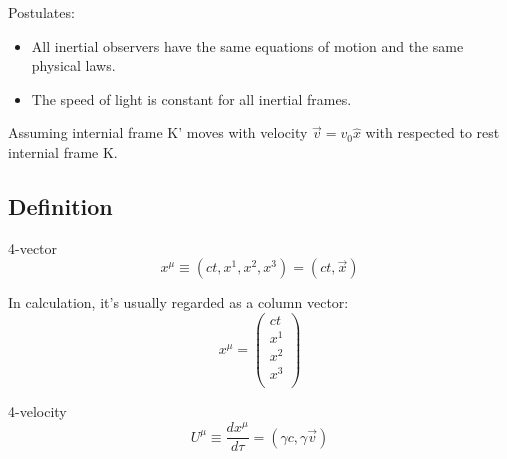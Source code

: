 Postulates:
\begin{itemize}
    \item All inertial observers have the same equations of motion and the same physical laws.
    \item The speed of light is constant for all inertial frames.
\end{itemize}
Assuming internial frame K' moves with velocity $\vec{v} = v_0\hat{x}$ with respected to
rest internial frame K.
\subsection{Definition}
\begin{description}
    \item {4-vector}
	\begin{equation}
	    \label{eqn:sr::4vectors}
		x^\mu \equiv (ct, x^1, x^2, x^3) = (ct, \vec{x})
	\end{equation}

	In calculation, it's usually regarded as a column vector:
	\begin{equation}
	    x^\mu = 
	    \begin{pmatrix}
		ct	\\
		x^1	\\
		x^2	\\
		x^3	\\
	    \end{pmatrix}
	\end{equation}

    \item{4-velocity}
	\begin{equation}
	    \label{eqn:sr::4velocity}
	    U^\mu \equiv \frac{dx^\mu}{d\tau} = (\gamma c, \gamma \vec{v})
	\end{equation}


\end{description}
